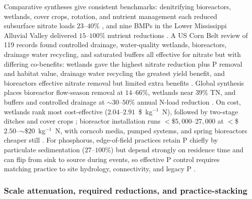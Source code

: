 Comparative syntheses give consistent benchmarks: denitrifying bioreactors,
wetlands, cover crops, rotation, and nutrient management each reduced
subsurface nitrate loads $23$--$40\%$ \parencite{Yuan2022}, and nine BMPs in
the Lower Mississippi Alluvial Valley delivered $15$--$100\%$ nutrient
reductions \parencite{Kröger2012}. A US Corn Belt review of 119 records found
controlled drainage, water-quality wetlands, bioreactors, drainage water
recycling, and saturated buffers all effective for nitrate but with differing
co-benefits: wetlands gave the highest nitrate reduction plus P removal and
habitat value, drainage water recycling the greatest yield benefit, and
bioreactors effective nitrate removal but limited extra benefits
\parencite{Mitchell2023}. Global synthesis places bioreactor flow-season
removal at $14$--$66\%$, wetlands near $39\%$ TN, and buffers and controlled
drainage at $\sim30$--$50\%$ annual N-load reduction \parencite{Wang2025b}. On
cost, wetlands rank most cost-effective ($2.04$--$2.91$~\$~kg$^{-1}$~N),
followed by two-stage ditches and cover crops
\parencite{Roley2016,Messer2021}; bioreactor installation runs
$<$\$$5{,}000$--$27{,}000$ at $<$\$$2.50$--$\sim$\$$20$~kg$^{-1}$~N, with
corncob media, pumped systems, and spring bioreactors cheaper still
\parencite{Christianson2021,Law2023,Hartfiel2024,Easton2019}. For phosphorus,
edge-of-field practices retain P chiefly by particulate sedimentation
($27$--$100\%$) but depend strongly on residence time and can flip from sink
to source during events, so effective P control requires matching practice to
site hydrology, connectivity, and legacy P
\parencite{Mendes2020,Kröger2013,Singh2020c,King2015,Ni2020}.

\subsubsection{Scale attenuation, required reductions, and practice-stacking}

